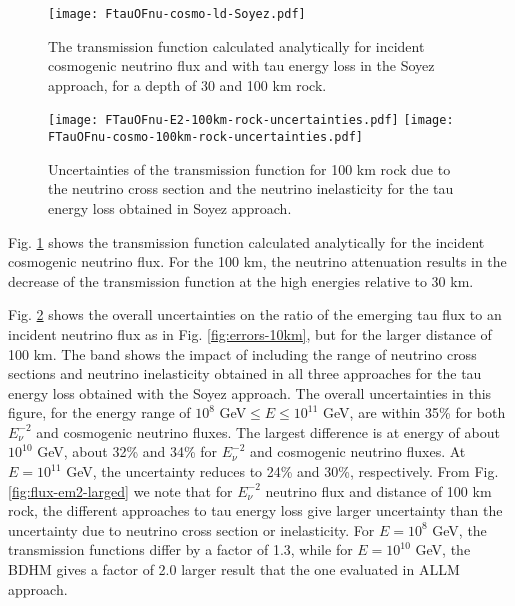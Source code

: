\documentclass[aps,10pt,twocolumn,tightenlines]{revtex4-1}
\begin{document}
\begin{figure}[htb]
\centering
	\texttt{[image: FtauOFnu-cosmo-ld-Soyez.pdf]}	
	\caption{The transmission function calculated analytically 
 for incident cosmogenic neutrino flux and with tau energy loss in the 
Soyez approach,  for a depth of 30 and 100 km rock.  
	}
\label{fig:flux-larged}
\end{figure}

\begin{figure}[htb]
\centering
	\texttt{[image: FTauOFnu-E2-100km-rock-uncertainties.pdf]}
	\texttt{[image: FTauOFnu-cosmo-100km-rock-uncertainties.pdf]}	
	\caption{Uncertainties of the transmission function 
 for 100 km rock 
	due to the neutrino cross section and the neutrino inelasticity for the tau energy loss obtained in Soyez approach.
	}
\label{fig:errors-100km}
\end{figure}

Fig. \ref{fig:flux-larged} shows the transmission function calculated 
analytically for the incident cosmogenic neutrino flux.
For the 100 km, the neutrino attenuation results in the decrease 
of the transmission function at the high energies relative to 30 km. 

Fig. \ref{fig:errors-100km} shows the overall uncertainties on the ratio of the emerging tau flux to an incident neutrino flux
as in Fig. \ref{fig:errors-10km}, but for the larger distance of 100 km.  The 
band shows the impact of including the range of neutrino cross sections and 
neutrino inelasticity 
obtained in all three approaches for the tau energy loss obtained with the 
Soyez approach.  
The overall uncertainties in this figure, for the energy range of 
$10^8 $ GeV$\leq E \leq 10^{11}$ GeV, are within 35\% 
for both $E_\nu^{-2}$ and cosmogenic neutrino fluxes.
The largest difference is at energy of about $10^{10}$ GeV, about 32\% and 34\% 
for $E_\nu^{-2}$ and cosmogenic neutrino fluxes.  
At  $E = 10^{11}$ GeV, the uncertainty reduces to 24\% and 30\%, respectively.
From Fig. \ref{fig:flux-em2-larged} we note that for $E_\nu^{-2}$ neutrino 
flux and distance of 100 km rock, the different approaches to tau energy 
loss give larger 
uncertainty than the uncertainty due to 
neutrino cross section or inelasticity. For $E=10^8$ GeV, 
the transmission functions differ by a factor of 1.3, while
for $E=10^{10}$ GeV, the BDHM gives a factor of 2.0 larger result 
that the one evaluated in ALLM approach. 
\end{document}
